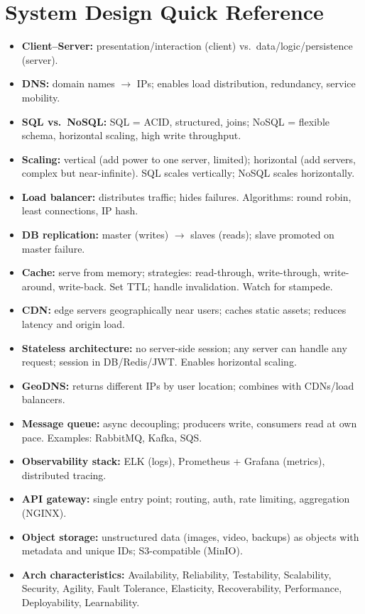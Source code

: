 \documentclass[hidelinks]{article}
\begin{document}
\section{System Design Quick Reference}
\begin{itemize}
  \item \textbf{Client--Server:} presentation/interaction (client) vs.\ data/logic/persistence (server).
  \item \textbf{DNS:} domain names $\to$ IPs; enables load distribution, redundancy, service mobility.
  \item \textbf{SQL vs.\ NoSQL:} SQL = ACID, structured, joins; NoSQL = flexible schema, horizontal
        scaling, high write throughput.
  \item \textbf{Scaling:} vertical (add power to one server, limited); horizontal (add servers, complex
        but near-infinite). SQL scales vertically; NoSQL scales horizontally.
  \item \textbf{Load balancer:} distributes traffic; hides failures. Algorithms: round robin, least
        connections, IP hash.
  \item \textbf{DB replication:} master (writes) $\to$ slaves (reads); slave promoted on master failure.
  \item \textbf{Cache:} serve from memory; strategies: read-through, write-through, write-around,
        write-back. Set TTL; handle invalidation. Watch for stampede.
  \item \textbf{CDN:} edge servers geographically near users; caches static assets; reduces latency
        and origin load.
  \item \textbf{Stateless architecture:} no server-side session; any server can handle any request;
        session in DB/Redis/JWT. Enables horizontal scaling.
  \item \textbf{GeoDNS:} returns different IPs by user location; combines with CDNs/load balancers.
  \item \textbf{Message queue:} async decoupling; producers write, consumers read at own pace.
        Examples: RabbitMQ, Kafka, SQS.
  \item \textbf{Observability stack:} ELK (logs), Prometheus + Grafana (metrics), distributed
        tracing.
  \item \textbf{API gateway:} single entry point; routing, auth, rate limiting, aggregation (NGINX).
  \item \textbf{Object storage:} unstructured data (images, video, backups) as objects with metadata
        and unique IDs; S3-compatible (MinIO).
  \item \textbf{Arch characteristics:} Availability, Reliability, Testability, Scalability, Security,
        Agility, Fault Tolerance, Elasticity, Recoverability, Performance, Deployability, Learnability.
\end{itemize}
\end{document}
